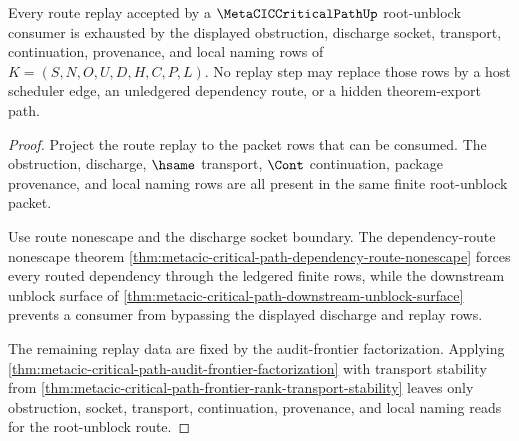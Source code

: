 \begin{theorem}
\label{thm:metacic-critical-path-root-unblock-route-readiness}
Every route replay accepted by a $\MetaCICCriticalPathUp$ root-unblock consumer is exhausted by the displayed obstruction, discharge socket, transport, continuation, provenance, and local naming rows of $K=(S,N,O,U,D,H,C,P,L)$. No replay step may replace those rows by a host scheduler edge, an unledgered dependency route, or a hidden theorem-export path.
\end{theorem}
\begin{proof}
Project the route replay to the packet rows that can be consumed. The obstruction, discharge, $\hsame$ transport, $\Cont$ continuation, package provenance, and local naming rows are all present in the same finite root-unblock packet.

Use route nonescape and the discharge socket boundary. The dependency-route nonescape theorem \autoref{thm:metacic-critical-path-dependency-route-nonescape} forces every routed dependency through the ledgered finite rows, while the downstream unblock surface of \autoref{thm:metacic-critical-path-downstream-unblock-surface} prevents a consumer from bypassing the displayed discharge and replay rows.

The remaining replay data are fixed by the audit-frontier factorization. Applying \autoref{thm:metacic-critical-path-audit-frontier-factorization} with transport stability from \autoref{thm:metacic-critical-path-frontier-rank-transport-stability} leaves only obstruction, socket, transport, continuation, provenance, and local naming reads for the root-unblock route.
\end{proof}

